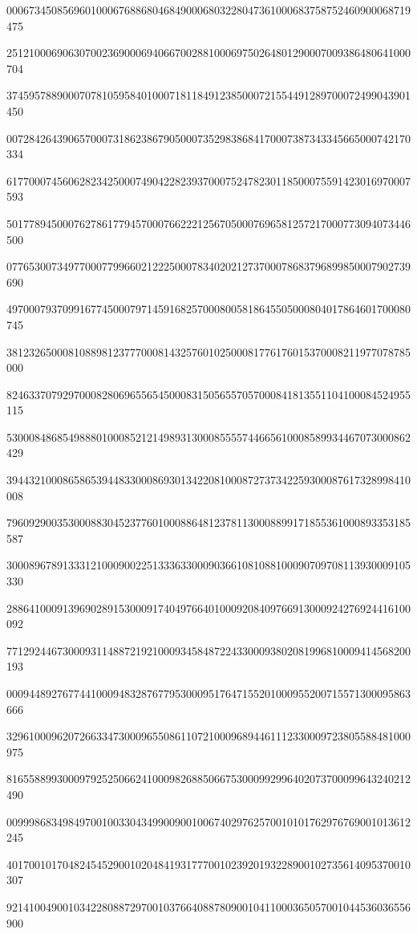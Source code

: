 \documentclass[10pt]{article}
\begin{document}
000673450856960100067688680468490006803228047361000683758752460900068719475\par
251210006906307002369000694066700288100069750264801290007009386480641000704\par
374595788900070781059584010007181184912385000721554491289700072499043901450\par
007284264390657000731862386790500073529838684170007387343345665000742170334\par
617700074560628234250007490422823937000752478230118500075591423016970007593\par
501778945000762786177945700076622212567050007696581257217000773094073446500\par
077653007349770007799660212225000783402021273700078683796899850007902739690\par
497000793709916774500079714591682570008005818645505000804017864601700080745\par
381232650008108898123777000814325760102500081776176015370008211977078785000\par
824633707929700082806965565450008315056557057000841813551104100084524955115\par
530008486854988801000852121498931300085555744665610008589934467073000862429\par
394432100086586539448330008693013422081000872737342259300087617328998410008\par
796092900353000883045237760100088648123781130008899171855361000893353185587\par
300089678913331210009002251333633000903661081088100090709708113930009105330\par
288641000913969028915300091740497664010009208409766913000924276924416100092\par
771292446730009311488721921000934584872243300093802081996810009414568200193\par
000944892767744100094832876779530009517647155201000955200715571300095863666\par
329610009620726633473000965508611072100096894461112330009723805588481000975\par
816558899300097925250662410009826885066753000992996402073700099643240212490\par
009998683498497001003304349900900100674029762570010101762976769001013612245\par
401700101704824545290010204841931777001023920193228900102735614095370010307\par
921410049001034228088729700103766408878090010411000365057001044536036556900\par
\end{document}
